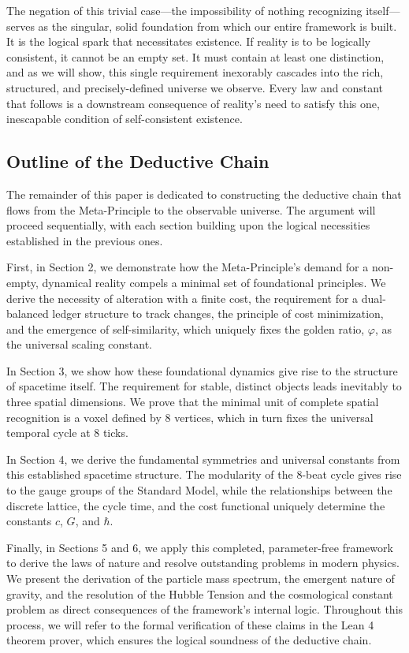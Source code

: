 \documentclass[11pt,a4paper]{article}
\begin{document}
The negation of this trivial case—the impossibility of nothing recognizing itself—serves as the singular, solid foundation from which our entire framework is built. It is the logical spark that necessitates existence. If reality is to be logically consistent, it cannot be an empty set. It must contain at least one distinction, and as we will show, this single requirement inexorably cascades into the rich, structured, and precisely-defined universe we observe. Every law and constant that follows is a downstream consequence of reality's need to satisfy this one, inescapable condition of self-consistent existence.

\subsection{Outline of the Deductive Chain}
The remainder of this paper is dedicated to constructing the deductive chain that flows from the Meta-Principle to the observable universe. The argument will proceed sequentially, with each section building upon the logical necessities established in the previous ones.

First, in Section 2, we demonstrate how the Meta-Principle's demand for a non-empty, dynamical reality compels a minimal set of foundational principles. We derive the necessity of alteration with a finite cost, the requirement for a dual-balanced ledger structure to track changes, the principle of cost minimization, and the emergence of self-similarity, which uniquely fixes the golden ratio, \(\varphi\), as the universal scaling constant.

In Section 3, we show how these foundational dynamics give rise to the structure of spacetime itself. The requirement for stable, distinct objects leads inevitably to three spatial dimensions. We prove that the minimal unit of complete spatial recognition is a voxel defined by 8 vertices, which in turn fixes the universal temporal cycle at 8 ticks.

In Section 4, we derive the fundamental symmetries and universal constants from this established spacetime structure. The modularity of the 8-beat cycle gives rise to the gauge groups of the Standard Model, while the relationships between the discrete lattice, the cycle time, and the cost functional uniquely determine the constants \(c\), \(G\), and \(\hbar\).

Finally, in Sections 5 and 6, we apply this completed, parameter-free framework to derive the laws of nature and resolve outstanding problems in modern physics. We present the derivation of the particle mass spectrum, the emergent nature of gravity, and the resolution of the Hubble Tension and the cosmological constant problem as direct consequences of the framework's internal logic. Throughout this process, we will refer to the formal verification of these claims in the Lean 4 theorem prover, which ensures the logical soundness of the deductive chain.
\end{document}
